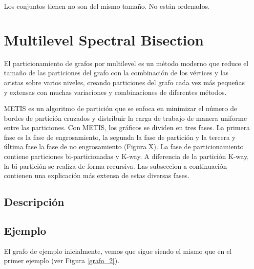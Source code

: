 Los conjuntos tienen no son del mismo tamaño. No están ordenados.

\section{Multilevel Spectral Bisection}\label{Multilevel-Spectral-Bisection}

El particionamiento de grafos por multilevel es un método moderno que reduce el tamaño de las particiones del grafo con la combinación de los vértices y las aristas sobre varios niveles, creando particiones del grafo cada vez más pequeñas y extensas con muchas variaciones y combinaciones de diferentes métodos.

METIS es un algoritmo de partición que se enfoca en minimizar el número de bordes de partición cruzados y distribuir la carga de trabajo de manera uniforme entre las particiones. Con METIS, los gráficos se dividen en tres fases. La primera fase es la fase de engrosamiento, la segunda la fase de partición y la tercera y última fase la fase de no engrosamiento (Figura X). La fase de particionamiento contiene particiones bi-particionadas y K-way. A diferencia de la partición K-way, la bi-partición se realiza de forma recursiva. Las subseccion a continuación contienen una explicación más extensa de estas diversas fases.

\subsection{Descripción}

\subsection{Ejemplo}

El grafo de ejemplo inicialmente, vemos que sigue siendo el mismo que en el primer ejemplo (ver Figura \ref{grafo_2}).


